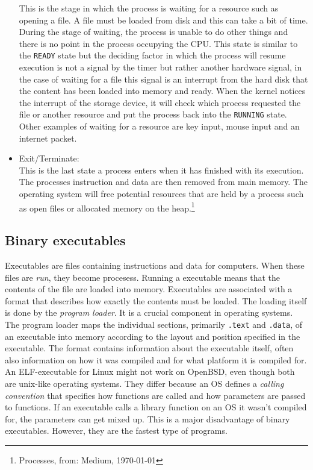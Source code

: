 \begin{itemize}
This is the stage in which the process is waiting for a resource such as opening a file. A file must be loaded from disk and this can take a bit of time.
During the stage of waiting, the process is unable to do other things and there is no point in the process occupying the CPU. This state is similar
to the \texttt{READY} state but the deciding factor in which the process will resume execution is not a signal by the timer but rather another hardware
signal, in the case of waiting for a file this signal is an interrupt from the hard disk that the content has been loaded into memory and ready. When
the kernel notices the interrupt of the storage device, it will check which process requested the file or another resource and put the process back into
the \texttt{RUNNING} state. Other examples of waiting for a resource are key input, mouse input and an internet packet.
\item Exit/Terminate: \\
This is the last state a process enters when it has finished with its execution. The processes instruction and data are then removed
from main memory. The operating system will free potential resources that are held by a process such as open files or allocated memory on the
heap.\footnote{Processes, from: Medium, \today}

\end{itemize}

\subsection{Binary executables}

Executables are files containing instructions and data for computers. When these files are \textit{run}, they
become procesess. Running a executable means that the contents of the file are loaded into memory. Executables
are associated with a format that describes how exactly the contents must be loaded. The loading itself
is done by the \textit{program loader}. It is a crucial component in operating systems. The program loader
maps the individual sections, primarily \texttt{.text} and \texttt{.data}, of an executable into memory according to the layout and position
specified in the executable. The format contains information about the executable itself, often also information on
how it was compiled and for what platform it is compiled for. An ELF-executable for Linux might not work on OpenBSD,
even though both are unix-like operating systems. They differ because an OS defines a \textit{calling convention} that
specifies how functions are called and how parameters are passed to functions. If an executable calls a library function on
an OS it wasn't compiled for, the parameters can get mixed up. This is a major disadvantage of binary executables. However,
they are the fastest type of programs.


